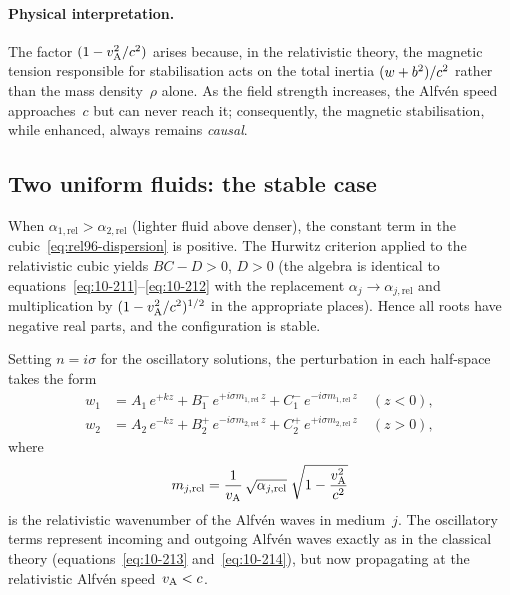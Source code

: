 \paragraph{Physical interpretation.}
The factor $(1-v_{\mathrm{A}}^{2}/c^{2})$ arises because, in the relativistic
theory, the magnetic tension responsible for stabilisation acts on the
total inertia $(w+b^{2})/c^{2}$ rather than the mass
density~$\rho$ alone.  As the field strength increases, the Alfv\'en
speed approaches~$c$ but can never reach it; consequently, the magnetic
stabilisation, while enhanced, always remains \emph{causal}.

\subsection{Two uniform fluids: the stable case}
\label{sec:rel96-stable}

When $\alpha_{1,\text{rel}}>\alpha_{2,\text{rel}}$ (lighter fluid above
denser), the constant term in the cubic~\eqref{eq:rel96-dispersion}
is positive.  The Hurwitz criterion applied to the relativistic
cubic yields $BC-D>0$, $D>0$ (the algebra is identical to
equations~\eqref{eq:10-211}--\eqref{eq:10-212} with the replacement
$\alpha_{j}\to\alpha_{j,\text{rel}}$ and multiplication by
$(1-v_{\mathrm{A}}^{2}/c^{2})^{1/2}$ in the appropriate places).  Hence all roots
have negative real parts, and the configuration is stable.

Setting $n=i\sigma$ for the oscillatory solutions, the perturbation in
each half-space takes the form
\begin{align}
  w_{1} &= A_{1}\,e^{+kz}
    + B_{1}^{-}\,e^{+i\sigma m_{1,\text{rel}}\,z}
    + C_{1}^{-}\,e^{-i\sigma m_{1,\text{rel}}\,z}
  \quad(z<0),
  \label{eq:rel96-stable-w1}\\
  w_{2} &= A_{2}\,e^{-kz}
    + B_{2}^{+}\,e^{-i\sigma m_{2,\text{rel}}\,z}
    + C_{2}^{+}\,e^{+i\sigma m_{2,\text{rel}}\,z}
  \quad(z>0),
  \label{eq:rel96-stable-w2}
\end{align}
where
\begin{equation}
  m_{j,\text{rel}}
    = \frac{1}{v_{\mathrm{A}}}\,\sqrt{\alpha_{j,\text{rel}}}\;
      \sqrt{1-\frac{v_{\mathrm{A}}^{2}}{c^{2}}}
  \label{eq:rel96-mj}
\end{equation}
is the relativistic wavenumber of the Alfv\'en waves in medium~$j$.
The oscillatory terms represent incoming and outgoing Alfv\'en waves
exactly as in the classical theory (equations~\eqref{eq:10-213}
and~\eqref{eq:10-214}), but now propagating at the relativistic Alfv\'en
speed~$v_{\mathrm{A}}<c$.


